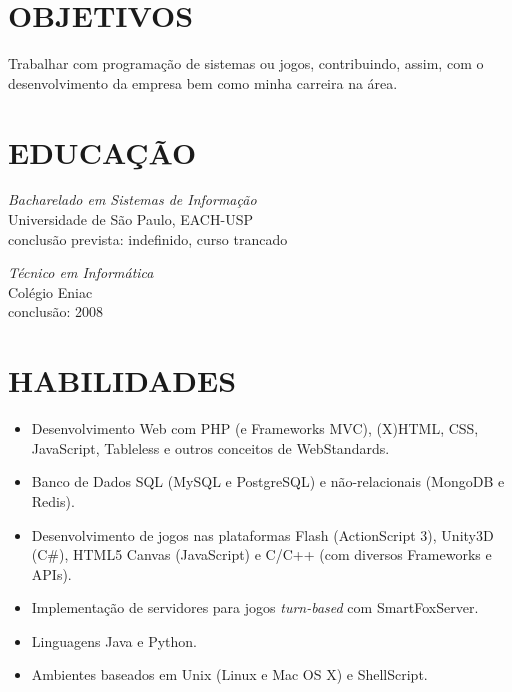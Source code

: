 \documentclass[line,margin]{res}
\begin{document}

\address{Rua A, 46, Cond. Grand Prix, C1-203 - Manaus, AM - Brazil}
\address{(11) 99932-6440 - bruno@croci.me - \href{http://bruno.croci.me/}{http://bruno.croci.me/}}

 
\begin{resume}
 
\section{OBJETIVOS} Trabalhar com programação de sistemas ou jogos, contribuindo,
                 assim, com o desenvolvimento da empresa bem como minha carreira
                 na área.
 
 
\section{EDUCAÇÃO} {\sl Bacharelado em Sistemas de Informação} \\
                Universidade de São Paulo, EACH-USP \\
                conclusão prevista: indefinido, curso trancado
                
                {\sl Técnico em Informática} \\
                Colégio Eniac \\
                conclusão: 2008 \\
 
 
\section{HABILIDADES} \begin{itemize}  \itemsep 1pt
                 \item Desenvolvimento Web com PHP (e Frameworks MVC), (X)HTML, CSS, JavaScript, 
                       Tableless e outros conceitos de WebStandards.
                 \item Banco de Dados SQL (MySQL e PostgreSQL) e não-relacionais (MongoDB e Redis).
                 \item Desenvolvimento de jogos nas plataformas Flash (ActionScript 3), Unity3D (C\#),
                       HTML5 Canvas (JavaScript) e C/C++ (com diversos Frameworks e APIs).
                 \item Implementação de servidores para jogos {\sl turn-based} com SmartFoxServer.
                 \item Linguagens Java e Python.
                 \item Ambientes baseados em Unix (Linux e Mac OS X) e ShellScript.
                 \end{itemize}
 

\end{resume}
\end{document}
